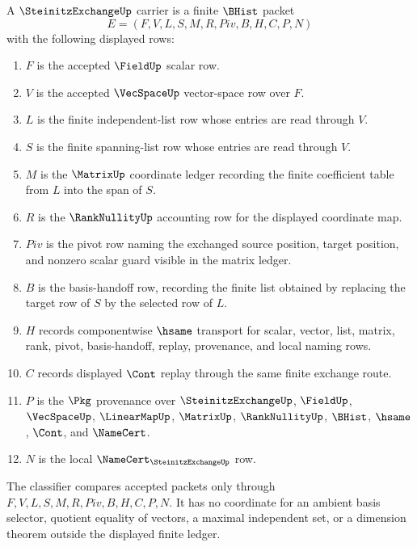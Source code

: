 \begin{definition}
\label{def:steinitz-exchange-carrier}
A $\SteinitzExchangeUp$ carrier is a finite $\BHist$ packet
$$
E=(F,V,L,S,M,R,Piv,B,H,C,P,N)
$$
with the following displayed rows:
\begin{enumerate}
\item $F$ is the accepted $\FieldUp$ scalar row.
\item $V$ is the accepted $\VecSpaceUp$ vector-space row over $F$.
\item $L$ is the finite independent-list row whose entries are read through $V$.
\item $S$ is the finite spanning-list row whose entries are read through $V$.
\item $M$ is the $\MatrixUp$ coordinate ledger recording the finite coefficient table from $L$ into the span of $S$.
\item $R$ is the $\RankNullityUp$ accounting row for the displayed coordinate map.
\item $Piv$ is the pivot row naming the exchanged source position, target position, and nonzero scalar guard visible in the matrix ledger.
\item $B$ is the basis-handoff row, recording the finite list obtained by replacing the target row of $S$ by the selected row of $L$.
\item $H$ records componentwise $\hsame$ transport for scalar, vector, list, matrix, rank, pivot, basis-handoff, replay, provenance, and local naming rows.
\item $C$ records displayed $\Cont$ replay through the same finite exchange route.
\item $P$ is the $\Pkg$ provenance over $\SteinitzExchangeUp$, $\FieldUp$, $\VecSpaceUp$, $\LinearMapUp$, $\MatrixUp$, $\RankNullityUp$, $\BHist$, $\hsame$, $\Cont$, and $\NameCert$.
\item $N$ is the local $\NameCert_{\SteinitzExchangeUp}$ row.
\end{enumerate}
The classifier compares accepted packets only through $F,V,L,S,M,R,Piv,B,H,C,P,N$. It has no coordinate for an ambient basis selector, quotient equality of vectors, a maximal independent set, or a dimension theorem outside the displayed finite ledger.
\end{definition}


